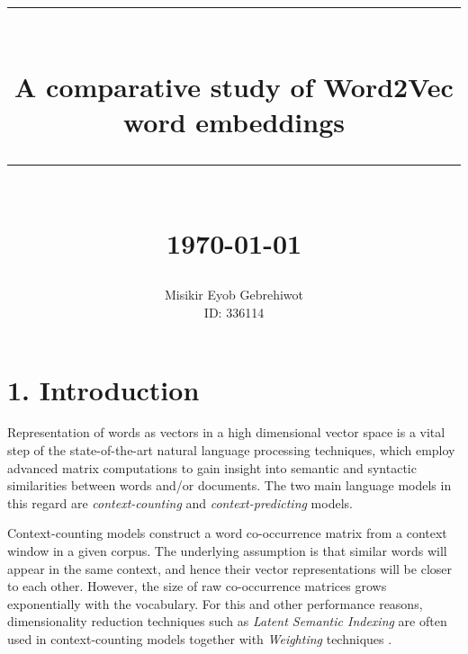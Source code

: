 \documentclass[12pt]{report}
\newcommand{\HRule}[1]{\rule{\linewidth}{#1}}
\begin{document}
\title{ \normalsize \textsc{}
		\\ [2.0cm]
		\HRule{0.5pt} \\
		\LARGE \textbf{A comparative study of Word2Vec word embeddings}
		\HRule{2pt} \\ [0.5cm]
		\normalsize \today \vspace*{5\baselineskip}}

\date{}

\author{
	    Misikir Eyob Gebrehiwot\\
		ID: 336114 \\ 
	}
\maketitle
\newpage

\sectionfont{\scshape}


\section*{1. Introduction}
Representation of words as vectors in a high dimensional vector space is a vital
step of the state-of-the-art natural language processing techniques, which employ
advanced matrix computations to gain insight into semantic and syntactic similarities
between words and/or documents. The two main language models in this regard are 
\emph{context-counting} and \emph{context-predicting} models.

Context-counting models construct a word co-occurrence matrix from a context window
in a given corpus. The underlying assumption is that similar words will appear in the same context, and hence their vector representations will be closer to each other. However, the size of raw co-occurrence matrices grows exponentially with the vocabulary. For this and other performance reasons, dimensionality reduction techniques such as \emph{Latent Semantic Indexing} are often used in context-counting models together with \emph{Weighting} techniques \cite{Manning:1999:FSN:311445,ARIS:ARIS1440380105}.
\end{document}
